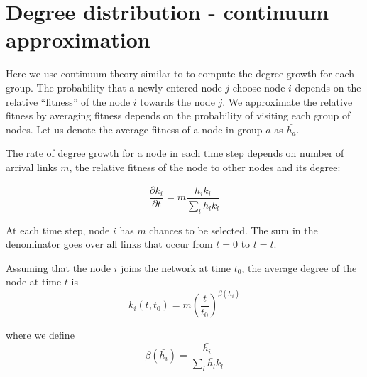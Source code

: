 
\section{Degree distribution - continuum approximation}




Here we use continuum theory similar to \cite{bianconi2001competition} to compute the degree growth for each group. The probability that a newly entered node $j$ choose node $i$ depends on the relative ``fitness'' of the node $i$ towards the node $j$. We approximate the relative fitness by averaging fitness depends on the probability of visiting each group of nodes. Let us denote the average fitness of a node in group $a$ as $\bar{h_{a}}$.

The rate of degree growth for a node in each time step depends on number of arrival links $m$, the relative fitness of the node to other nodes and its degree:

\begin{equation}
\label{eq:k_growth}
    \frac{\partial k_i}{\partial t} = m \frac{ \bar{h_{i}} k_i}{\sum_{l} \bar{h_{l}} k_l}
\end{equation}
 
At each time step, node $i$ has $m$ chances to be selected. The sum in the denominator goes over all links that occur from $t=0$ to $t = t$.


Assuming that the node $i$ joins the network at time $t_0$, the average degree of the node at time $t$ is
\begin{equation}
\label{eq:degree_growth}
    k_i(t,t_{0}) = m  (\frac{t}{t_0})^{\beta(\bar{h_{i}})}
\end{equation}

where we define
\begin{equation}
\label{eq:beta}
    \beta(\bar{h_{i}}) = \frac{ \bar{h_{i}} }{\sum_{l} \bar{h_{l}} k_l} 
\end{equation}

